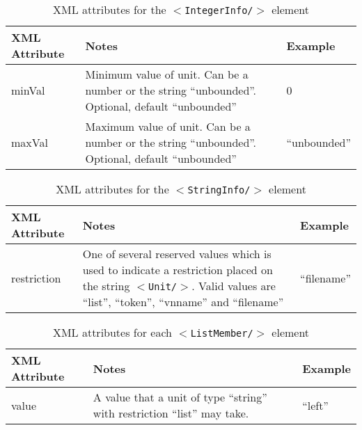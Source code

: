 \documentclass[pdftex,a4paper]{article}
\newcommand{\XML}[2][]{{\tt \small $<$#2#1/$>$}}
\begin{document}
\begin{table}[!h]
  \begin{center}
    \caption{XML attributes for the \XML{IntegerInfo} element}
    \label{tab:integerinfo-unit}
    \begin{tabular}{|l|p{6cm}|l|}
      \hline

      \textbf{XML Attribute} & \textbf{Notes} & \textbf{Example}\\

      \hline

      minVal & Minimum value of unit. Can be a number or the string
      ``unbounded''. Optional, default ``unbounded'' & 0\\

      \hline

      maxVal & Maximum value of unit. Can be a number or the string
      ``unbounded''. Optional, default ``unbounded'' & ``unbounded'' \\

      \hline

    \end{tabular}
  \end{center}
\end{table}

\begin{table}[!h]
  \begin{center}
    \caption{XML attributes for the \XML{StringInfo} element}
    \label{tab:stringinfo-unit}
    \begin{tabular}{|l|p{6cm}|l|}
      \hline

      \textbf{XML Attribute} & \textbf{Notes} & \textbf{Example}\\

      \hline

      restriction & One of several reserved values which is used to
      indicate a restriction placed on the string \XML{Unit}. Valid
      values are ``list'', ``token'', ``vnname'' and
      ``filename'' & ``filename'' \\

      \hline

    \end{tabular}
  \end{center}
\end{table}

\begin{table}[!h]
  \begin{center}
    \caption{XML attributes for each \XML{ListMember} element}
    \label{tab:listmember-unit}
    \begin{tabular}{|l|p{6cm}|l|}
      \hline

      \textbf{XML Attribute} & \textbf{Notes} & \textbf{Example}\\

      \hline

      value & A value that a unit of type ``string'' with restriction
      ``list'' may take. & ``left''\\

      \hline

      \hline
    \end{tabular}
  \end{center}
\end{table}
\end{document}
